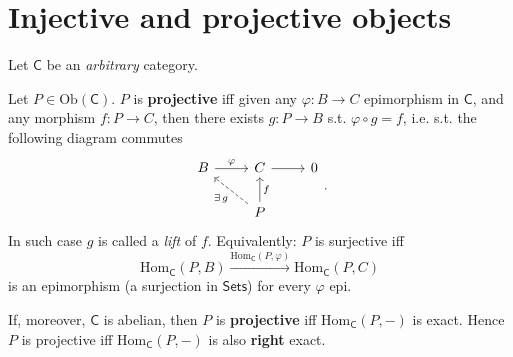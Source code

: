 \section{Injective and projective objects}
Let $\mathsf{C}$ be an \textit{arbitrary} category.

\begin{defn}
	Let $P \in \mathrm{Ob} \left(\mathsf{C}\right)$.
	$P$ is \textbf{projective} iff given any $\varphi: B \to C$ epimorphism in $\mathsf{C}$, 
	and any morphism $f: P \to C$, then there exists $g: P \to B$ s.t. $\varphi \circ g = f$, 
	i.e. s.t. the following diagram commutes
	\begin{equation}
	\begin{tikzcd}
		B \arrow[r, "\varphi", rightarrow] &
		C \arrow[r, "", rightarrow] &
		0 \\
		&
		P \arrow[lu, "\exists\, g", dashrightarrow] \arrow[u, "f"', rightarrow]  &
	\end{tikzcd}
	.\end{equation} 
	In such case $g$ is called a \textit{lift} of $f$.\newline
	Equivalently:
	$P$ is surjective iff
	\begin{equation}
	\mathrm{Hom}_{\mathsf{C}} \left( P, B \right) \xrightarrow{\mathrm{Hom}_{\mathsf{C}} \left( P, \varphi \right)} 
	\mathrm{Hom}_{\mathsf{C}} \left( P, C \right)
	\end{equation} 
	is an epimorphism (a surjection in $\mathsf{Sets}$) for every $\varphi$ epi.
\end{defn}

\begin{rem}
	If, moreover, $\mathsf{C}$ is abelian, then
	$P$ is \textbf{projective} iff $\mathrm{Hom}_{\mathsf{C}} \left( P, - \right)$ is exact.
	Hence $P$ is projective iff $\mathrm{Hom}_{\mathsf{C}} \left( P, -\right)$ is also \textbf{right} exact.
\end{rem}

